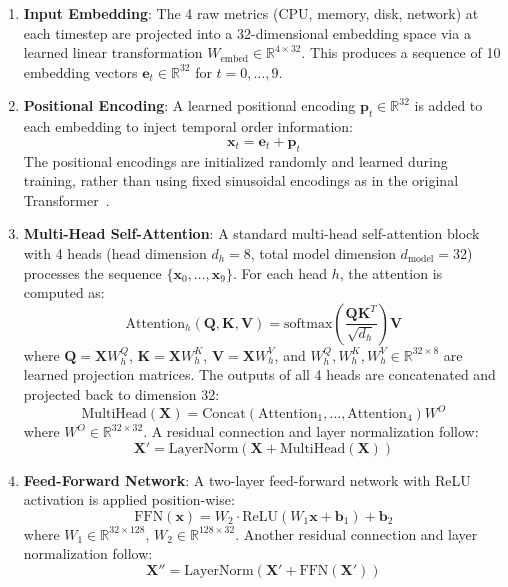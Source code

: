 \begin{enumerate}
  \item \textbf{Input Embedding}: The 4 raw metrics (CPU, memory, disk, network) at each timestep are projected into a 32-dimensional embedding space via a learned linear transformation $W_{\text{embed}} \in \mathbb{R}^{4 \times 32}$. This produces a sequence of 10 embedding vectors $\mathbf{e}_t \in \mathbb{R}^{32}$ for $t = 0, \ldots, 9$.

  \item \textbf{Positional Encoding}: A learned positional encoding $\mathbf{p}_t \in \mathbb{R}^{32}$ is added to each embedding to inject temporal order information:
  \begin{equation}
  \mathbf{x}_t = \mathbf{e}_t + \mathbf{p}_t
  \end{equation}
  The positional encodings are initialized randomly and learned during training, rather than using fixed sinusoidal encodings as in the original Transformer~\cite{Vaswani17}.

  \item \textbf{Multi-Head Self-Attention}: A standard multi-head self-attention block with 4 heads (head dimension $d_h = 8$, total model dimension $d_{\text{model}} = 32$) processes the sequence $\{\mathbf{x}_0, \ldots, \mathbf{x}_9\}$. For each head $h$, the attention is computed as:
  \begin{equation}
  \text{Attention}_h(\mathbf{Q}, \mathbf{K}, \mathbf{V}) = \text{softmax}\left(\frac{\mathbf{Q}\mathbf{K}^T}{\sqrt{d_h}}\right) \mathbf{V}
  \end{equation}
  where $\mathbf{Q} = \mathbf{X} W_h^Q$, $\mathbf{K} = \mathbf{X} W_h^K$, $\mathbf{V} = \mathbf{X} W_h^V$, and $W_h^Q, W_h^K, W_h^V \in \mathbb{R}^{32 \times 8}$ are learned projection matrices. The outputs of all 4 heads are concatenated and projected back to dimension 32:
  \begin{equation}
  \text{MultiHead}(\mathbf{X}) = \text{Concat}(\text{Attention}_1, \ldots, \text{Attention}_4) W^O
  \end{equation}
  where $W^O \in \mathbb{R}^{32 \times 32}$. A residual connection and layer normalization follow:
  \begin{equation}
  \mathbf{X}' = \text{LayerNorm}(\mathbf{X} + \text{MultiHead}(\mathbf{X}))
  \end{equation}

  \item \textbf{Feed-Forward Network}: A two-layer feed-forward network with ReLU activation is applied position-wise:
  \begin{equation}
  \text{FFN}(\mathbf{x}) = W_2 \cdot \text{ReLU}(W_1 \mathbf{x} + \mathbf{b}_1) + \mathbf{b}_2
  \end{equation}
  where $W_1 \in \mathbb{R}^{32 \times 128}$, $W_2 \in \mathbb{R}^{128 \times 32}$. Another residual connection and layer normalization follow:
  \begin{equation}
  \mathbf{X}'' = \text{LayerNorm}(\mathbf{X}' + \text{FFN}(\mathbf{X}'))
  \end{equation}
\end{enumerate}


